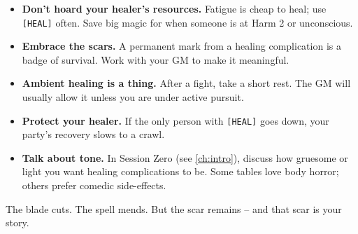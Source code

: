 \begin{itemize}
  \item \textbf{Don't hoard your healer's resources.} Fatigue is cheap to heal; use \texttt{[HEAL]} often. Save big magic for when someone is at Harm 2 or unconscious.
  \item \textbf{Embrace the scars.} A permanent mark from a healing complication is a badge of survival. Work with your GM to make it meaningful.
  \item \textbf{Ambient healing is a thing.} After a fight, take a short rest. The GM will usually allow it unless you are under active pursuit.
  \item \textbf{Protect your healer.} If the only person with \texttt{[HEAL]} goes down, your party's recovery slows to a crawl.
  \item \textbf{Talk about tone.} In Session Zero (see \ref{ch:intro}), discuss how gruesome or light you want healing complications to be. Some tables love body horror; others prefer comedic side-effects.
\end{itemize}

\noindent The blade cuts. The spell mends. But the scar remains -- and that scar is your story.